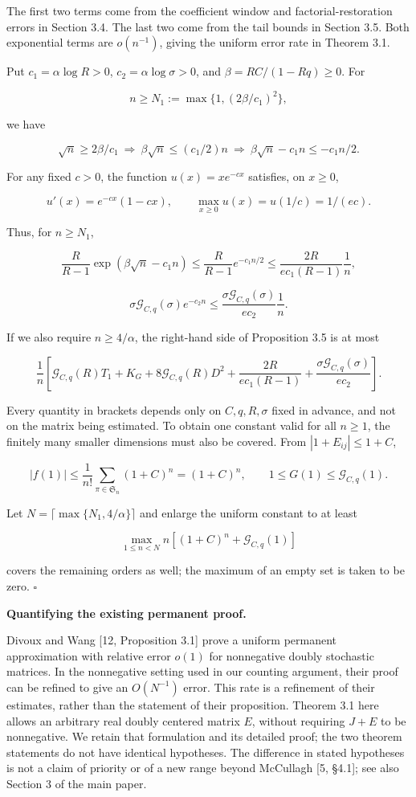 \documentclass[11pt,a4paper]{article}
\begin{document}
The first two terms come from the coefficient window and factorial-restoration errors in Section 3.4. The last two come from the tail bounds in Section 3.5. Both exponential terms are \(o(n^{-1})\), giving the uniform error rate in Theorem 3.1.

Put \(c_1=\alpha\log R>0\), \(c_2=\alpha\log\sigma>0\), and \(\beta=RC/(1-Rq)\ge0\). For

\[
n\ge N_1:=\max\{1,(2\beta/c_1)^2\},
\]

we have

\[
\sqrt n\ge2\beta/c_1
\ \Longrightarrow\ {}
\beta\sqrt n\le(c_1/2)n
\ \Longrightarrow\ {}
\beta\sqrt n-c_1n\le-c_1n/2.
\]

For any fixed \(c>0\), the function \(u(x)=xe^{-cx}\) satisfies, on \(x\ge0\),

\[
u'(x)=e^{-cx}(1-cx),\qquad
\max_{x\ge0}u(x)=u(1/c)=1/(ec).
\]

Thus, for \(n\ge N_1\),

\[
\frac R{R-1}\exp(\beta\sqrt n-c_1n)
\le\frac R{R-1}e^{-c_1n/2}
\le\frac{2R}{ec_1(R-1)}\frac1n,
\]

\[
\sigma\mathcal G_{C,q}(\sigma)e^{-c_2n}
\le\frac{\sigma\mathcal G_{C,q}(\sigma)}{ec_2}\frac1n.
\]

If we also require \(n\ge4/\alpha\), the right-hand side of Proposition 3.5 is at most

\[
\frac1n\left[
\mathcal G_{C,q}(R)T_1+K_G+8\mathcal G_{C,q}(R)D^2
+\frac{2R}{ec_1(R-1)}
+\frac{\sigma\mathcal G_{C,q}(\sigma)}{ec_2}\right].
\]

Every quantity in brackets depends only on \(C,q,R,\sigma\) fixed in advance, and not on the matrix being estimated. To obtain one constant valid for all \(n\ge1\), the finitely many smaller dimensions must also be covered. From \(|1+E_{ij}|\le1+C\),

\[
|f(1)|\le\frac1{n!}\sum_{\pi\in \mathfrak S_n}(1+C)^n=(1+C)^n,
\qquad 1\le G(1)\le\mathcal G_{C,q}(1).
\]

Let \(N=\lceil\max\{N_1,4/\alpha\}\rceil\) and enlarge the uniform constant to at least

\[
\max_{1\le n<N}n\left[(1+C)^n+\mathcal G_{C,q}(1)\right]
\]

covers the remaining orders as well; the maximum of an empty set is taken to be zero. \(\square\)

\textbf{Quantifying the existing permanent proof.}

Divoux and Wang {[}12, Proposition 3.1{]} prove a uniform permanent approximation with relative error \(o(1)\) for nonnegative doubly stochastic matrices. In the nonnegative setting used in our counting argument, their proof can be refined to give an \(O(N^{-1})\) error. This rate is a refinement of their estimates, rather than the statement of their proposition. Theorem 3.1 here allows an arbitrary real doubly centered matrix \(E\), without requiring \(J+E\) to be nonnegative. We retain that formulation and its detailed proof; the two theorem statements do not have identical hypotheses. The difference in stated hypotheses is not a claim of priority or of a new range beyond McCullagh {[}5, §4.1{]}; see also Section 3 of the main paper.
\end{document}
